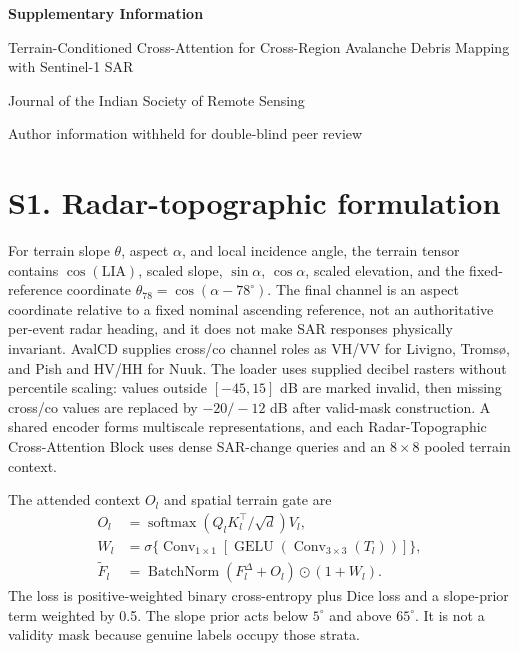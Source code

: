 \documentclass[11pt,a4paper]{article}
\begin{document}
\begin{center}
{\Large\bfseries Supplementary Information\par}
\vspace{0.5em}
{\large Terrain-Conditioned Cross-Attention for Cross-Region Avalanche Debris Mapping with Sentinel-1 SAR\par}
\vspace{0.5em}
{\small Journal of the Indian Society of Remote Sensing\par}
\vspace{0.3em}
{\small Author information withheld for double-blind peer review\par}
\end{center}

\section*{S1. Radar-topographic formulation}

For terrain slope $\theta$, aspect $\alpha$, and local incidence angle, the terrain tensor contains $\cos(\mathrm{LIA})$, scaled slope, $\sin\alpha$, $\cos\alpha$, scaled elevation, and the fixed-reference coordinate $\theta_{78}=\cos(\alpha-78^\circ)$. The final channel is an aspect coordinate relative to a fixed nominal ascending reference, not an authoritative per-event radar heading, and it does not make SAR responses physically invariant. AvalCD supplies cross/co channel roles as VH/VV for Livigno, Troms{\o}, and Pish and HV/HH for Nuuk. The loader uses supplied decibel rasters without percentile scaling: values outside $[-45,15]$ dB are marked invalid, then missing cross/co values are replaced by $-20/-12$ dB after valid-mask construction. A shared encoder forms multiscale representations, and each Radar-Topographic Cross-Attention Block uses dense SAR-change queries and an $8\times8$ pooled terrain context.

The attended context $O_l$ and spatial terrain gate are
\begin{align}
O_l &= \operatorname{softmax}\left(Q_lK_l^\top/\sqrt{d}\right)V_l,\\
W_l &= \sigma\{\operatorname{Conv}_{1\times1}[\operatorname{GELU}(\operatorname{Conv}_{3\times3}(T_l))]\},\\
\widetilde{F}_l &= \operatorname{BatchNorm}(F_l^\Delta+O_l)\odot(1+W_l).
\end{align}
The loss is positive-weighted binary cross-entropy plus Dice loss and a slope-prior term weighted by 0.5. The slope prior acts below $5^\circ$ and above $65^\circ$. It is not a validity mask because genuine labels occupy those strata.
\end{document}
